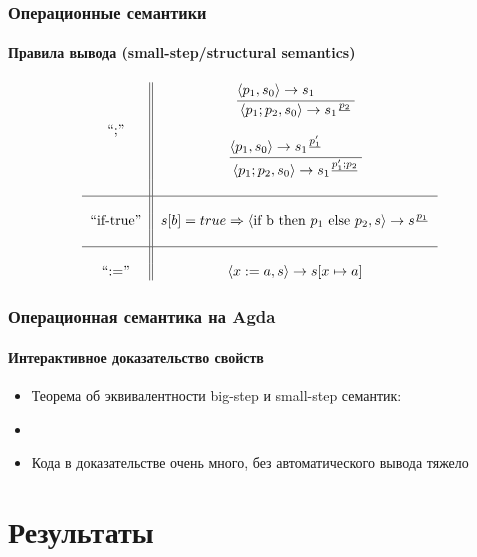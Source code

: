 \documentclass[10pt,pdf,hyperref={unicode}]{beamer}
\begin{document}
      \begin{frame}
         \frametitle{Операционные семантики}
         \framesubtitle{Правила вывода (small-step/structural semantics)}

         \begin{align*}
            \begin{tabular}{c || c}
               ``;''       & \begin{tabular}{c}
                                $\seqssn$ \\
                                \\
                                $\seqssj$
                             \end{tabular} \\
               \\ \hline \\
               ``if-true'' & $\iftruess$ \\
               \\ \hline \\
               ``:=''      & $\assignns$ \\
            \end{tabular}
         \end{align*}
      \end{frame}

      \begin{frame}
         \frametitle{Операционная семантика на Agda}
         \framesubtitle{Интерактивное доказательство свойств}
            \begin{itemize}
               \item Теорема об эквивалентности big-step и small-step семантик:
               \item[] \small{}
               \item Кода в доказательстве очень много, без автоматического вывода тяжело
            \end{itemize}
      \end{frame}

      \section{Результаты}
\end{document}

